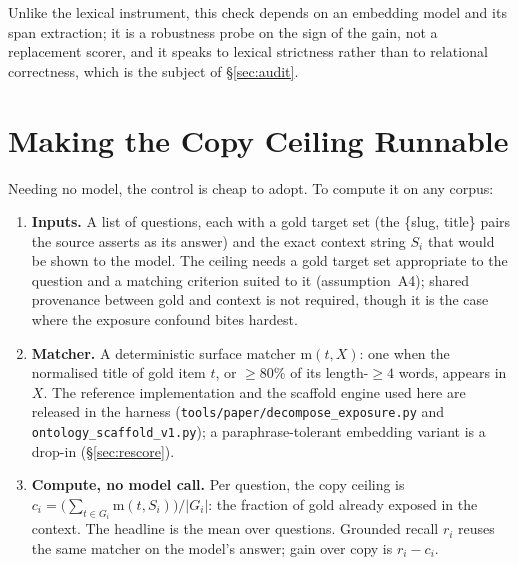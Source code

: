 \documentclass[10pt,twocolumn]{article}
\begin{document}
Unlike the lexical instrument, this check depends on an embedding model and its span extraction; it
is a robustness probe on the sign of the gain, not a replacement scorer, and it speaks to lexical
strictness rather than to relational correctness, which is the subject of \S\ref{sec:audit}.

\section{Making the Copy Ceiling Runnable}\label{sec:runnable}
Needing no model, the control is cheap to adopt. To compute it on any corpus:
\begin{enumerate}[topsep=2pt,itemsep=1pt,leftmargin=1.6em]
\item \textbf{Inputs.} A list of questions, each with a gold target set (the \{slug, title\} pairs the source asserts as its answer) and the exact context string $S_i$ that would be shown to the model. The ceiling needs a gold target set appropriate to the question and a matching criterion suited to it (assumption~A4); shared provenance between gold and context is not required, though it is the case where the exposure confound bites hardest.
\item \textbf{Matcher.} A deterministic surface matcher $\mathrm{m}(t,X)$: one when the normalised title of gold item $t$, or $\geq80\%$ of its length-$\geq4$ words, appears in $X$. The reference implementation and the scaffold engine used here are released in the harness (\texttt{tools/paper/decompose\_exposure.py} and \texttt{ontology\_scaffold\_v1.py}); a paraphrase-tolerant embedding variant is a drop-in (\S\ref{sec:rescore}).
\item \textbf{Compute, no model call.} Per question, the copy ceiling is $c_i=\bigl(\sum_{t\in G_i}\mathrm{m}(t,S_i)\bigr)/|G_i|$: the fraction of gold already exposed in the context. The headline is the mean over questions. Grounded recall $r_i$ reuses the same matcher on the model's answer; gain over copy is $r_i-c_i$.
\end{enumerate}
\end{document}
